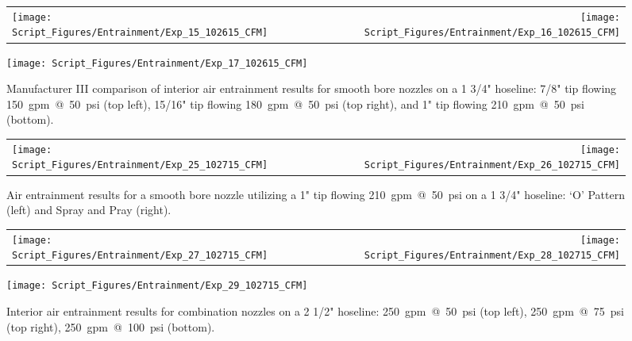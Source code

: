 \documentclass[12pt,oneside]{book}
\begin{document}
\clearpage

\begin{figure}[!ht]
\begin{tabular*}{\textwidth}{lr}
\texttt{[image: Script\_Figures/Entrainment/Exp\_15\_102615\_CFM]} &
\texttt{[image: Script\_Figures/Entrainment/Exp\_16\_102615\_CFM]} \\
\end{tabular*}
\centering
\texttt{[image: Script\_Figures/Entrainment/Exp\_17\_102615\_CFM]} 
\caption[Manufacturer III Air Entrainment from Smooth Bore Nozzle Varying Pressure and Flowrate]{Manufacturer III comparison of interior air entrainment results for smooth bore nozzles on a 1 3/4" hoseline: 7/8" tip flowing 150~gpm~@~50~psi (top left), 15/16" tip flowing 180~gpm~@~50~psi (top right), and 1" tip flowing 210~gpm~@~50~psi (bottom).}
\label{fig:1_5_Interior_Smooth_Bore_Manufacturer_III}
\end{figure}

\clearpage

\begin{figure}[!ht]
\begin{tabular*}{\textwidth}{lr}
\texttt{[image: Script\_Figures/Entrainment/Exp\_25\_102715\_CFM]} &
\texttt{[image: Script\_Figures/Entrainment/Exp\_26\_102715\_CFM]} \\
\end{tabular*}
\caption[Air Entrainment for `O' Pattern versus `Spray and Pray']{Air entrainment results for a smooth bore nozzle utilizing a 1" tip flowing 210~gpm~@~50~psi on a 1 3/4" hoseline: `O' Pattern (left) and Spray and Pray (right).}
\label{fig:Nozzle_Movement}
\end{figure}

\clearpage

\begin{figure}[!ht]
\begin{tabular*}{\textwidth}{lr}
\texttt{[image: Script\_Figures/Entrainment/Exp\_27\_102715\_CFM]} &
\texttt{[image: Script\_Figures/Entrainment/Exp\_28\_102715\_CFM]} \\
\end{tabular*}
\centering
\texttt{[image: Script\_Figures/Entrainment/Exp\_29\_102715\_CFM]} 
\caption[Air Entrainment for 2~1/2~in. Hoseline with Combination Nozzle from Interior]{Interior air entrainment results for combination nozzles on a 2 1/2" hoseline: 250~gpm~@~50~psi (top left), 250~gpm~@~75~psi (top right), 250~gpm~@~100~psi (bottom).}
\label{fig:2_5_Interior_Combination}
\end{figure}
\end{document}
